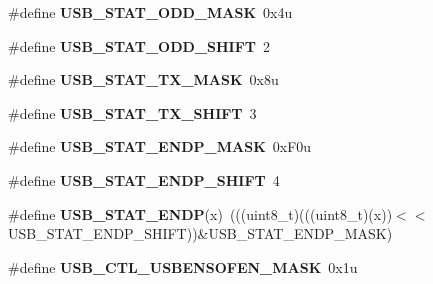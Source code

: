\begin{DoxyCompactItemize}
\item 
\#define {\bfseries U\+S\+B\+\_\+\+S\+T\+A\+T\+\_\+\+O\+D\+D\+\_\+\+M\+A\+SK}~0x4u\hypertarget{group__USB__Register__Masks_ga49caa3c5b36fc89eadadd60cdf331643}{}\label{group__USB__Register__Masks_ga49caa3c5b36fc89eadadd60cdf331643}

\item 
\#define {\bfseries U\+S\+B\+\_\+\+S\+T\+A\+T\+\_\+\+O\+D\+D\+\_\+\+S\+H\+I\+FT}~2\hypertarget{group__USB__Register__Masks_ga15f3e2fa671ea1a59e0b24a9697faf8a}{}\label{group__USB__Register__Masks_ga15f3e2fa671ea1a59e0b24a9697faf8a}

\item 
\#define {\bfseries U\+S\+B\+\_\+\+S\+T\+A\+T\+\_\+\+T\+X\+\_\+\+M\+A\+SK}~0x8u\hypertarget{group__USB__Register__Masks_gab953f904ef3a2b838a922ebdf69cf140}{}\label{group__USB__Register__Masks_gab953f904ef3a2b838a922ebdf69cf140}

\item 
\#define {\bfseries U\+S\+B\+\_\+\+S\+T\+A\+T\+\_\+\+T\+X\+\_\+\+S\+H\+I\+FT}~3\hypertarget{group__USB__Register__Masks_ga5173e8423017932d90919ddb18f918bd}{}\label{group__USB__Register__Masks_ga5173e8423017932d90919ddb18f918bd}

\item 
\#define {\bfseries U\+S\+B\+\_\+\+S\+T\+A\+T\+\_\+\+E\+N\+D\+P\+\_\+\+M\+A\+SK}~0x\+F0u\hypertarget{group__USB__Register__Masks_gad8a184e838de511e23aa32011fc9f0b6}{}\label{group__USB__Register__Masks_gad8a184e838de511e23aa32011fc9f0b6}

\item 
\#define {\bfseries U\+S\+B\+\_\+\+S\+T\+A\+T\+\_\+\+E\+N\+D\+P\+\_\+\+S\+H\+I\+FT}~4\hypertarget{group__USB__Register__Masks_ga5d85a4b028002bc9ce0f1650111cd49a}{}\label{group__USB__Register__Masks_ga5d85a4b028002bc9ce0f1650111cd49a}

\item 
\#define {\bfseries U\+S\+B\+\_\+\+S\+T\+A\+T\+\_\+\+E\+N\+DP}(x)~(((uint8\+\_\+t)(((uint8\+\_\+t)(x))$<$$<$U\+S\+B\+\_\+\+S\+T\+A\+T\+\_\+\+E\+N\+D\+P\+\_\+\+S\+H\+I\+FT))\&U\+S\+B\+\_\+\+S\+T\+A\+T\+\_\+\+E\+N\+D\+P\+\_\+\+M\+A\+SK)\hypertarget{group__USB__Register__Masks_ga0302fe6637ae59174d7702947430dbba}{}\label{group__USB__Register__Masks_ga0302fe6637ae59174d7702947430dbba}

\item 
\#define {\bfseries U\+S\+B\+\_\+\+C\+T\+L\+\_\+\+U\+S\+B\+E\+N\+S\+O\+F\+E\+N\+\_\+\+M\+A\+SK}~0x1u\hypertarget{group__USB__Register__Masks_gaa406be72ac0b31143d3a3bc357af334b}{}\label{group__USB__Register__Masks_gaa406be72ac0b31143d3a3bc357af334b}


\end{DoxyCompactItemize}
